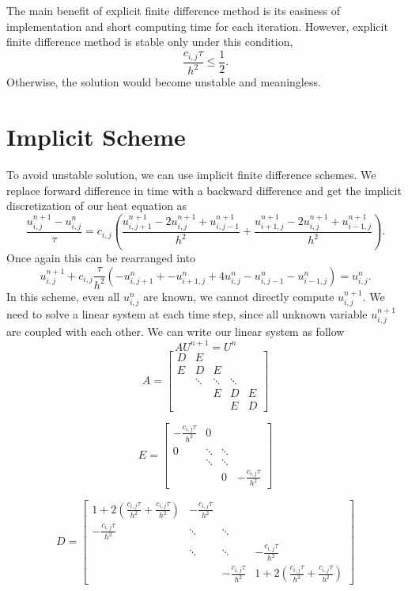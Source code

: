 \documentclass[10pt,a4paper]{report}
\begin{document}
The main benefit of explicit finite difference method is its easiness of implementation and short computing time for each iteration. However, explicit finite difference method is stable only under this condition,\[{\frac{c_{i,j}\tau}{h^2}}\leq {\frac{1}{2}}.\] Otherwise, the solution would become unstable and meaningless.

\section{Implicit Scheme}
To avoid unstable solution, we can use implicit finite difference schemes. We replace forward difference in time with a backward difference and get the implicit discretization of our heat equation as \[{\frac{u^{n+1}_{i,j}-u^n_{i,j}}{\tau}}=c_{i,j}({\frac{u^{n+1}_{i,j+1}-2u^{n+1}_{i,j}+u^{n+1}_{i,j-1}}{h^2}}+{\frac{u^{n+1}_{i+1,j}-2u^{n+1}_{i,j}+u^{n+1}_{i-1,j}}{h^2}}).\]
Once again this can be rearranged into
\[u^{n+1}_{i,j}+c_{i,j}{\frac{\tau}{h^2}}(-u^n_{i,j+1}+-u^n_{i+1,j}+4u^n_{i,j}-u^n_{i,j-1}-u^n_{i-1,j})=u^{n}_{i,j}.\]
In this scheme, even all $u^n_{i,j}$ are known, we cannot directly compute $u^{n+1}_{i,j} $. We need to solve a linear system at each time step, since all unknown variable $u^{n+1}_{i,j}$ are coupled with each other. We can write our linear system as follow \[AU^{n+1}=U^{n}\] 
\[A=\begin{bmatrix}
D & E &   &   &   \\
E & D & E &   &   \\
  & \ddots & \ddots &\ddots & \\
  &   & E & D & E \\
  &   &   & E & D    
\end{bmatrix}
\]

\[E=\begin{bmatrix}
-{\frac{c_{i,j}\tau}{h^2}} & 0 & & \\
0 & \ddots & \ddots & \\
  & \ddots & \ddots & \\
  &        & 0 & -{\frac{c_{i,j}\tau}{h^2}}  
\end{bmatrix}
\]

\[D=\begin{bmatrix}
1+2({\frac{c_{i,j}\tau}{h^2}}+{\frac{c_{i,j}\tau}{h^2}}) & -{\frac{c_{i,j}\tau}{h^2}} & &  \\
-{\frac{c_{i,j}\tau}{h^2}} & \ddots & \ddots & \\
& \ddots & \ddots & -{\frac{c_{i,j}\tau}{h^2}}\\
 &  & -{\frac{c_{i,j}\tau}{h^2}} & 1+2({\frac{c_{i,j}\tau}{h^2}}+{\frac{c_{i,j}\tau}{h^2}})
\end{bmatrix}
\]
\end{document}
